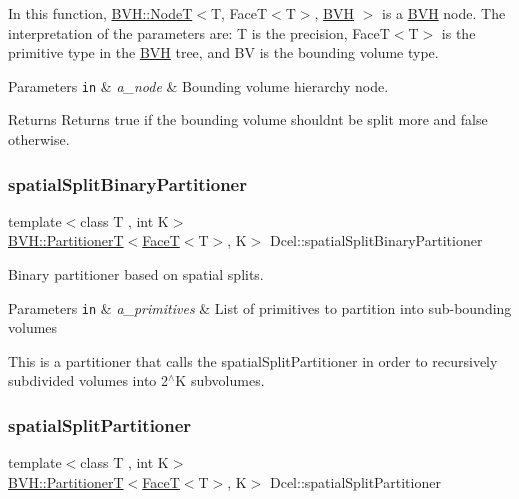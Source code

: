 In this function, \hyperlink{classBVH_1_1NodeT}{B\+V\+H\+::\+NodeT}$<$T, Face\+T$<$\+T$>$, \hyperlink{namespaceBVH}{B\+VH} $>$ is a \hyperlink{namespaceBVH}{B\+VH} node. The interpretation of the parameters are\+: T is the precision, Face\+T$<$\+T$>$ is the primitive type in the \hyperlink{namespaceBVH}{B\+VH} tree, and BV is the bounding volume type. 
\begin{DoxyParams}[1]{Parameters}
\mbox{\tt in}  & {\em a\+\_\+node} & Bounding volume hierarchy node. \\
\hline
\end{DoxyParams}
\begin{DoxyReturn}{Returns}
Returns true if the bounding volume shouldn\textquotesingle{}t be split more and false otherwise. 
\end{DoxyReturn}
\mbox{\label{namespaceDcel_a08217ffcd4cfc6f58a3b0b3f780fc611}} 
\subsubsection{\texorpdfstring{spatial\+Split\+Binary\+Partitioner}{spatialSplitBinaryPartitioner}}
{\footnotesize\ttfamily template$<$class T , int K$>$ \\
\hyperlink{namespaceBVH_a7c33d54da9893d506709b2ca96b76f55}{B\+V\+H\+::\+PartitionerT}$<$\hyperlink{classDcel_1_1FaceT}{FaceT}$<$T$>$, K$>$ Dcel\+::spatial\+Split\+Binary\+Partitioner}



Binary partitioner based on spatial splits. 


\begin{DoxyParams}[1]{Parameters}
\mbox{\tt in}  & {\em a\+\_\+primitives} & List of primitives to partition into sub-\/bounding volumes\\
\hline
\end{DoxyParams}
This is a partitioner that calls the spatial\+Split\+Partitioner in order to recursively subdivided volumes into 2$^\wedge$K subvolumes. \mbox{\label{namespaceDcel_ab4f869248e23d47bb01ad06c76288fef}} 
\subsubsection{\texorpdfstring{spatial\+Split\+Partitioner}{spatialSplitPartitioner}}
{\footnotesize\ttfamily template$<$class T , int K$>$ \\
\hyperlink{namespaceBVH_a7c33d54da9893d506709b2ca96b76f55}{B\+V\+H\+::\+PartitionerT}$<$\hyperlink{classDcel_1_1FaceT}{FaceT}$<$T$>$, K$>$ Dcel\+::spatial\+Split\+Partitioner}



